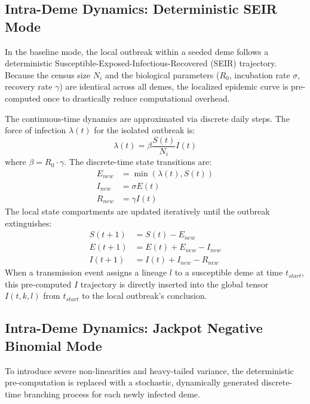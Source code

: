 \documentclass[12pt]{article}
\begin{document}
\subsection{Intra-Deme Dynamics: Deterministic SEIR Mode}
In the baseline mode, the local outbreak within a seeded deme follows a deterministic Susceptible-Exposed-Infectious-Recovered (SEIR) trajectory. Because the census size $N_i$ and the biological parameters ($R_0$, incubation rate $\sigma$, recovery rate $\gamma$) are identical across all demes, the localized epidemic curve is pre-computed once to drastically reduce computational overhead.

The continuous-time dynamics are approximated via discrete daily steps. The force of infection $\lambda(t)$ for the isolated outbreak is:
\begin{equation}
    \lambda(t) = \beta \frac{S(t)}{N_i} I(t)
\end{equation}
where $\beta = R_0 \cdot \gamma$. The discrete-time state transitions are:
\begin{align}
    E_{new} &= \min(\lambda(t), S(t)) \\
    I_{new} &= \sigma E(t) \\
    R_{new} &= \gamma I(t)
\end{align}
The local state compartments are updated iteratively until the outbreak extinguishes:
\begin{align}
    S(t+1) &= S(t) - E_{new} \\
    E(t+1) &= E(t) + E_{new} - I_{new} \\
    I(t+1) &= I(t) + I_{new} - R_{new}
\end{align}
When a transmission event assigns a lineage $l$ to a susceptible deme at time $t_{start}$, this pre-computed $I$ trajectory is directly inserted into the global tensor $I(t, k, l)$ from $t_{start}$ to the local outbreak's conclusion.

\subsection{Intra-Deme Dynamics: Jackpot Negative Binomial Mode}
To introduce severe non-linearities and heavy-tailed variance, the deterministic pre-computation is replaced with a stochastic, dynamically generated discrete-time branching process for each newly infected deme. 
\end{document}
